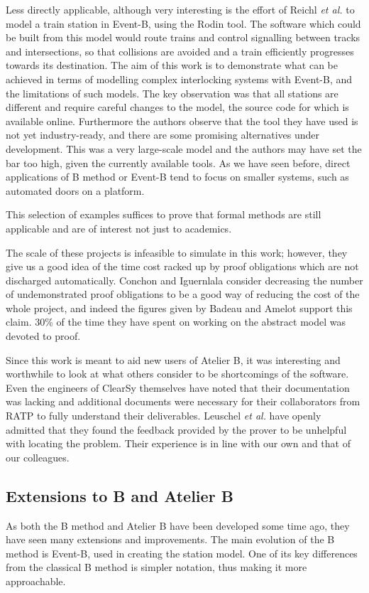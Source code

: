 \documentclass[12pt,journal,duplex]{IEEEtran}
\begin{document}
	Less directly applicable, although very interesting is the effort of Reichl \textit{et al.} to model a train station in Event-B, using the Rodin tool\cite{station model}. The software which could be built from this model would route trains and control signalling between tracks and intersections, so that collisions are avoided and a train efficiently progresses towards its destination. The aim of this work is to demonstrate what can be achieved in terms of modelling complex interlocking systems with Event-B, and the limitations of such models. The key observation was that all stations are different and require careful changes to the model, the source code for which is available online. Furthermore the authors observe that the tool they have used is not yet industry-ready, and there are some promising alternatives under development. This was a very large-scale model and the authors may have set the bar too high, given the currently available tools. As we have seen before, direct applications of B method or Event-B tend to focus on smaller systems, such as automated doors on a platform.

	This selection of examples suffices to prove that formal methods are still applicable and are of interest not just to academics.

	The scale of these projects is infeasible to simulate in this work; however, they give us a good idea of the time cost racked up by proof obligations which are not discharged automatically. Conchon and Iguernlala consider decreasing the number of undemonstrated proof obligations to be a good way of reducing the cost of the whole project\cite{survey}, and indeed the figures given by Badeau and Amelot support this claim. 30\% of the time they have spent on working on the abstract model was devoted to proof\cite{airport shuttle}.

	Since this work is meant to aid new users of Atelier B, it was interesting and worthwhile to look at what others consider to be shortcomings of the software. Even the engineers of ClearSy themselves have noted that their documentation was lacking and additional documents were necessary for their collaborators from RATP to fully understand their deliverables\cite{screen doors}. Leuschel \emph{et al.} have openly admitted that they found the feedback provided by the prover to be unhelpful with locating the problem\cite{San Juan metro}. Their experience is in line with our own and that of our colleagues.

	\subsection{Extensions to B and Atelier B}
	As both the B method and Atelier B have been developed some time ago, they have seen many extensions and improvements. The main evolution of the B method is Event-B, used in creating the station model. One of its key differences from the classical B method is simpler notation, thus making it more approachable.\cite{event-b}
\end{document}
